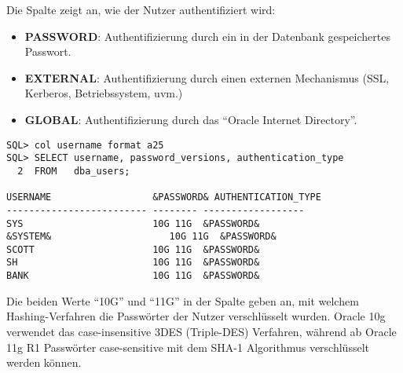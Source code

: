        Die Spalte  zeigt an, wie der Nutzer
        authentifiziert wird:
        \begin{itemize}
          \item \textbf{PASSWORD}: Authentifizierung durch ein in der Datenbank
          gespeichertes Passwort.
          \item \textbf{EXTERNAL}: Authentifizierung durch einen externen
          Mechanismus (SSL, Kerberos, Betriebssystem, uvm.)
          \item \textbf{GLOBAL}: Authentifizierung durch das
          \enquote{Oracle Internet Directory}.
        \end{itemize}
        \begin{lstlisting}[caption={In der Datenbank gespeicherte Nutzerdaten
        abrufen},label=admin207,language=oracle_sql,alsolanguage=sqlplus]
SQL> col username format a25
SQL> SELECT username, password_versions, authentication_type
  2  FROM   dba_users;

USERNAME                  &PASSWORD& AUTHENTICATION_TYPE
------------------------- -------- ------------------
SYS                       10G 11G  &PASSWORD&
&SYSTEM&                     10G 11G  &PASSWORD&
SCOTT                     10G 11G  &PASSWORD&
SH                        10G 11G  &PASSWORD&
BANK                      10G 11G  &PASSWORD&
        \end{lstlisting}
        Die beiden Werte \enquote{10G} und \enquote{11G} in der Spalte
         geben an, mit welchem Hashing-Verfahren die
        Passw\"orter der Nutzer verschl\"usselt wurden. Oracle 10g verwendet das
        case-insensitive 3DES (Triple-DES) Verfahren, w\"ahrend ab Oracle 11g R1
        Passw\"orter case-sensitive mit dem SHA-1 Algorithmus verschl\"usselt
        werden k\"onnen.

